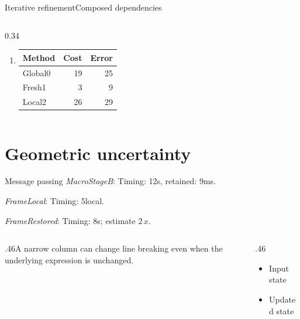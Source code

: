 \documentclass[10pt,aspectratio=43]{beamer}
\newcommand{\fuzzlayerA}[1]{\textbf{#1}}
\newcommand{\fuzzlayerB}[1]{\fuzzlayerA{#1}}
\newcommand{\fuzzlayerC}[1]{\fuzzlayerB{#1}}
\newcommand{\fuzzterm}[1]{\fuzzlayerC{#1}}
\newcommand{\fuzzpair}[2]{\fuzzterm{#1}: #2}
\newcommand{\fuzzunit}{ms}
\let\fuzzoriginalunit\fuzzunit
\newcommand{\fuzzcoefficient}{1}
\newcommand{\fuzzscale}[2][\fuzzcoefficient]{#1\,#2}
\begin{document}
\begin{frame}[t,shrink=5]{Iterative refinement}{Composed dependencies}
{\begin{columns}[onlytextwidth,t]
\begin{column}{0.34\textwidth}
\begin{enumerate}
\item \begin{tabular}{lrr}Method&Cost&Error\\\hline
Global0&19&25\\
Fresh1&3&9\\
Local2&26&29\\
\end{tabular}
\end{enumerate}
\end{column}
\end{columns}}
\par {}
\end{frame}
\renewcommand{\fuzzunit}{s}
\renewcommand{\fuzzcoefficient}{2}
\renewcommand{\fuzzterm}[1]{{\textit{#1}}}
\section{Geometric uncertainty}
\begin{frame}[t]{Message passing}
\fuzzpair{MacroStageB}{Timing: 12\fuzzunit, retained: 9\fuzzoriginalunit.}\par
{\renewcommand{\fuzzunit}{local}\fuzzpair{FrameLocal}{Timing: 5\fuzzunit.}\par}
\fuzzpair{FrameRestored}{Timing: 8\fuzzunit; estimate $\fuzzscale{x}$.}\par
\begin{columns}[T]\begin{column}{.46\textwidth}A narrow column can change line breaking even when the underlying expression is unchanged.\end{column}\begin{column}{.46\textwidth}\begin{itemize}\item Input state\item Updated state\end{itemize}\end{column}\end{columns}
\end{frame}
\renewcommand{\fuzzunit}{us}
\renewcommand{\fuzzcoefficient}{3}
\renewcommand{\fuzzterm}[1]{{\textit{#1}}}
\end{document}
